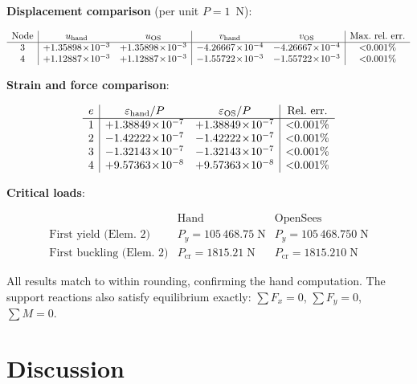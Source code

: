 \documentclass[11pt, a4paper]{article}
\begin{document}
\medskip
\noindent\textbf{Displacement comparison} (per unit $P=1$~N):

\[
\begin{array}{c|cc|cc|c}
\text{Node} & u_{\text{hand}} & u_{\text{OS}} & v_{\text{hand}} & v_{\text{OS}} & \text{Max.\ rel.\ err.} \\
\hline
3 & +1.35898\!\times\!10^{-3} & +1.35898\!\times\!10^{-3} & -4.26667\!\times\!10^{-4} & -4.26667\!\times\!10^{-4} & $<0.001\%$ \\
4 & +1.12887\!\times\!10^{-3} & +1.12887\!\times\!10^{-3} & -1.55722\!\times\!10^{-3} & -1.55722\!\times\!10^{-3} & $<0.001\%$
\end{array}
\]

\noindent\textbf{Strain and force comparison}:

\[
\begin{array}{c|cc|c}
e & \varepsilon_{\text{hand}}/P & \varepsilon_{\text{OS}}/P & \text{Rel.\ err.} \\
\hline
1 & +1.38849\!\times\!10^{-7} & +1.38849\!\times\!10^{-7} & $<0.001\%$ \\
2 & -1.42222\!\times\!10^{-7} & -1.42222\!\times\!10^{-7} & $<0.001\%$ \\
3 & -1.32143\!\times\!10^{-7} & -1.32143\!\times\!10^{-7} & $<0.001\%$ \\
4 & +9.57363\!\times\!10^{-8} & +9.57363\!\times\!10^{-8} & $<0.001\%$
\end{array}
\]

\noindent\textbf{Critical loads}:

\[
\begin{array}{l|cc}
 & \text{Hand} & \text{OpenSees} \\
\hline
\text{First yield (Elem.\ 2)} & P_y = 105\,468.75\;\text{N} & P_y = 105\,468.750\;\text{N} \\
\text{First buckling (Elem.\ 2)} & P_{\text{cr}} = 1815.21\;\text{N} & P_{\text{cr}} = 1815.210\;\text{N}
\end{array}
\]

\noindent All results match to within rounding, confirming the hand computation.  The support reactions also satisfy equilibrium exactly: $\sum F_x = 0$, $\sum F_y = 0$, $\sum M = 0$.
\section{Discussion}
\end{document}
